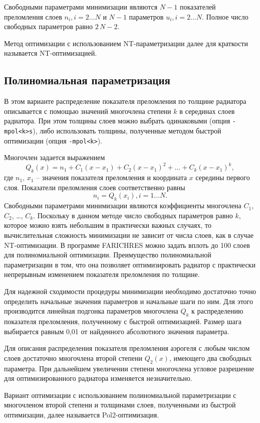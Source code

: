 \documentclass[12pt]{article}
\begin{document}
Свободными параметрами минимизации являются $N-1$ показателей преломления слоев $n_i, i=2\ldots N$ и $N-1$ параметров $u_i, i=2\ldots N$. 
Полное число свободных параметров равно $2\,N - 2$.

Метод оптимизации с использованием NT-параметризации далее для краткости называется NT-оптимизацией.

\subsection{Полиномиальная параметризация}
\label{ss:polpar}
В этом варианте распределение показателя преломления по толщине радиатора описывается с помощью значений многочлена степени $k$ в серединах 
слоев радиатора. При этом толщины слоев можно выбрать одинаковыми (опция {\tt -mpol<k>s}), либо использовать толщины, полученные методом быстрой 
оптимизации (опция {\tt -mpol<k>}).

Многочлен задается выражением
\[ Q_k(x) = n_1 + C_1(x-x_1) + C_2(x-x_1)^2 + \ldots + C_k(x-x_1)^k, \]
где $n_1,\,x_1$ -- значения показателя преломления и координата $x$ середины первого слоя. Показатели преломления слоев соответственно равны
\[ n_i = Q_k(x_i), i=1\ldots N. \]
Свободными параметрами минимизации являются коэффициенты многочлена $C_1$, $C_2$, \ldots, $C_k$. Поскольку в данном методе число 
свободных параметров равно $k$, которое можно взять небольшим в практически важных случаях, то вычислительная сложность минимизации 
не зависит от числа слоев, как в случае NT-оптимизации. В программе FARICHRES можно задать вплоть до 100 слоев для полиномиальной оптимизации. 
Преимущество полиномиальной параметризации в том, что она позволяет оптимизировать радиатор с практически непрерывным изменением показателя преломления по толщине.

Для надежной сходимости процедуры минимизации необходимо достаточно точно определить начальные значения
параметров и начальные шаги по ним. Для этого производится линейная подгонка параметров многочлена $Q_k$ к распределению показателя преломления,
полученному с быстрой оптимизацией. Размер шага выбирается равным 0,01 от найденного абсолютного значения параметра.

Для описания распределения показателя преломления аэрогеля с любым числом слоев достаточно многочлена второй степени $Q_2(x)$, имеющего два свободных параметра. 
При дальнейшем увеличении степени многочлена угловое разрешение для оптимизированного радиатора изменяется незначительно.

Вариант оптимизации с использованием полиномиальной параметризации с многочленом второй степени и толщинами слоев, полученными из быстрой 
оптимизации, далее называется Pol2-оптимизация.
\end{document}
